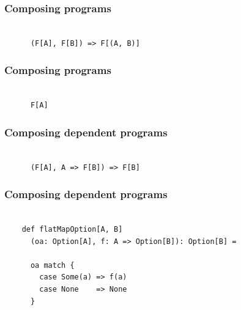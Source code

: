 \documentclass{beamer}
\begin{document}
\begin{frame}[fragile]

  \frametitle{Composing programs}

  \centering
  \Large

  \begin{minipage}{1.0\textwidth}
    \begin{verbatim}

      (F[A], F[B]) => F[(A, B)]

    \end{verbatim}
  \end{minipage}

\end{frame}

\begin{frame}[fragile]

  \frametitle{Composing programs}

  \centering
  \Large

  \begin{minipage}{0.36\textwidth}
    \begin{verbatim}

      F[A]

    \end{verbatim}
  \end{minipage}

\end{frame}

\begin{frame}[fragile]

  \frametitle{Composing dependent programs}

  \centering
  \Large

  \begin{minipage}{0.82\textwidth}
    \begin{verbatim}

      (F[A], A => F[B]) => F[B]

    \end{verbatim}
  \end{minipage}

\end{frame}

\begin{frame}[fragile]

  \frametitle{Composing dependent programs}

  \begin{verbatim}

    def flatMapOption[A, B]
      (oa: Option[A], f: A => Option[B]): Option[B] =

      oa match {
        case Some(a) => f(a)
        case None    => None
      }

  \end{verbatim}

\end{frame}
\end{document}
